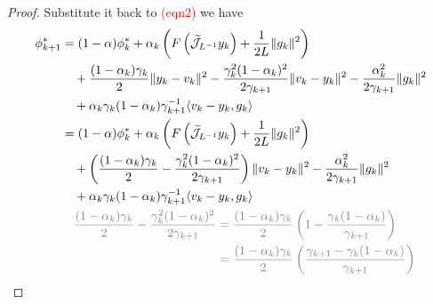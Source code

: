 \documentclass[12pt]{article}
\begin{document}
\begin{proof}
        Substitute it back to \textcolor{red}{(eqn2)} we have 
        \begin{align*}
            \phi_{k + 1}^* &= 
            (1 - \alpha)\phi_k^* + 
            \alpha_k
            \left(
                F\left(\widetilde{\mathcal J}_{L^{-1}} y_k\right) + 
                \frac{1}{2L}\Vert g_k\Vert^2
            \right)
            \\
            &\quad 
            + \frac{(1 - \alpha_k)\gamma_k}{2}\Vert y_k - v_k\Vert^2
            - \frac{\gamma_k^2(1 - \alpha_k)^2}{2\gamma_{k + 1}}\Vert v_k - y_k\Vert^2
            - \frac{\alpha_k^2}{2\gamma_{k + 1}}\Vert g_k\Vert^2
            \\
            &\quad 
            + \alpha_k\gamma_k(1 - \alpha_k)\gamma_{k + 1}^{-1}\langle v_k -y_k, g_k\rangle
            \\
            &= 
                (1 - \alpha)\phi_k^* + 
                \alpha_k
                \left(
                    F\left(\widetilde{\mathcal J}_{L^{-1}} y_k\right) + 
                    \frac{1}{2L}\Vert g_k\Vert^2
                \right)
                \\
                &\quad 
                + 
                \left(
                    \frac{(1 - \alpha_k)\gamma_k}{2}
                    - 
                    \frac{\gamma_k^2(1 - \alpha_k)^2}{2\gamma_{k + 1}}
                \right)
                \Vert v_k - y_k\Vert^2
                - \frac{\alpha_k^2}{2\gamma_{k + 1}}\Vert g_k\Vert^2
                \\
                &\quad 
                + \alpha_k\gamma_k(1 - \alpha_k)\gamma_{k + 1}^{-1}\langle v_k -y_k, g_k\rangle
            \\
            & \quad 
            \textcolor{gray}{  
                \begin{aligned}
                    \frac{(1 - \alpha_k)\gamma_k}{2}
                    - 
                    \frac{\gamma_k^2(1 - \alpha_k)^2}{2\gamma_{k + 1}}   
                    &= 
                    \frac{(1 - \alpha_k)\gamma_k}{2}
                    \left(
                        1 - \frac{\gamma_k (1 - \alpha_k)}{\gamma_{k + 1}}
                    \right)
                    \\
                    &= 
                    \frac{(1 - \alpha_k)\gamma_k}{2}
                    \left(
                        \frac{\gamma_{k + 1} - \gamma_k(1 - \alpha_k)}{\gamma_{k + 1}}
                    \right)
                    \\

\end{aligned}}
\end{align*}
\end{proof}
\end{document}
